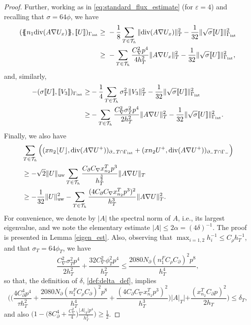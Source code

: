 \documentclass{amsart}
\newcommand{\norm}[2]{\|{#1}\|_{{#2}}}
\newcommand{\jump}[1]{[\kern-0.6mm [{#1}]\kern-0.6mm]}
\newcommand{\av}[1]{\{\kern-1.2mm \{{#1}\}\kern-1.2mm\}}
\newcommand{\su}{\sum_{T \in \Th}}
\newcommand{\inner}[3]{({#1},{#2})_{{#3}}}
\newcommand{\Th}{\mathcal{T}_h}
\newcommand{\gint}{\Gamma_{\rm int}}
\newcommand{\gif}{\Gamma_-}
\newcommand{\Div}{{\rm div}}
\newcommand{\cinvT}{C_{\partial}}
\newcommand{\cinv}{C_{\nabla}}
\newcommand{\normal}{{n}}
\newcommand{\jumpu}[1]{ \lfloor #1 \rfloor }
\newcommand{\avg }[1]{ \av{ #1}}
\newcommand{\xn}{x_{n_2}^{T}}
\theoremstyle{definition}
\theoremstyle{remark}
\numberwithin{equation}{section}
\begin{document}
\begin{proof}
Further, working as in \eqref{eq:standard_flux_estimate} (for $\varepsilon=4$) and recalling that $\sigma=64\phi$, we have
	\begin{equation*}\begin{split}
			 \inner{\avg{\normal_1 \Div(A\nabla U_x) }}{\jump{U}}{\gint}
			  \geq&\ -\frac{1}{8}  \su \norm{ \Div(A\nabla U_x) }{ T}^2 -  \frac{1}{32}\norm{\sqrt{\sigma} \jump{U}}{\gint}^2\\
			    \geq&\ -  \su \frac{\cinv^2p^4}{4h_T^2}\norm{ A\nabla U_x }{ T}^2 -  \frac{1}{32}\norm{\sqrt{\sigma} \jump{U}}{\gint}^2,
	\end{split}\end{equation*}
	and, similarly,
	\begin{equation*}\begin{split}
		-	   \inner{\sigma \jump{U}}{\jump{ V_3 }}{\gint }
			\geq& -\frac{1}{4}
			\su  \sigma_T^2\norm{ V_3}{T}^2
			-
			\frac{1}{32}   \norm{\sqrt{\sigma}\jump{U}}{\gint }^2\\
				\geq& -
			\su  \frac{\cinv^2\sigma_T^2p^4}{2h_T^2}\norm{A\nabla U}{T}^2
			-
			\frac{1}{32}   \norm{\sqrt{\sigma}\jump{U}}{\gint }^2.
	\end{split}\end{equation*}
	Finally, we also have
	\begin{equation*}\begin{split}
			&\su \Big( \inner{x\normal_2 \jumpu{U}}{ \Div(A\nabla U^+) }{\partial_- T \cap \gint}
			+
			\inner{x\normal_2 U^+}{ \Div(A\nabla U^+) }{\partial_- T \cap \gif}\Big)
			\\
			&\geq  -\sqrt{2}\norm{U}{\rm uw}
	\su	\frac{	\cinvT\cinv	\xn p^3}{h_T^{\frac{3}{2}}}
			\norm{ A \nabla U }{T}\\
			&
			\geq
			-\frac{1}{32}\norm{U}{\rm uw}^2
			-
			\su\frac{(4\cinvT\cinv	\xn p^3)^2}{h_T^3}
			\norm{ A\nabla U }{T}^2.
	\end{split}\end{equation*}
	For convenience, we denote by $|A|$ the spectral norm of $A$, i.e., its largest eigenvalue, and we note the elementary estimate $|A| \leq 2 \alpha=(4\delta)^{-1}$. The proof is presented in Lemma \ref{eigen_est}. Also, observing that $\max_{i=1,2}h_i^{-1}\le C_{\rho} h_T^{-1}$, and that $\sigma_T=64\phi_T$, we have
	\[
	\frac{\cinv^2\sigma_T^2p^4}{2h_T^2}+  \frac{32\cinv^2\phi_T^2 p^4}{h_T^2}\le \frac{2080N_\partial (n_1^FC_\rho\cinvT)^2p^8}{h_T^4},
	\]
	so that, the definition of $\delta$, \eqref{def:delta_def}, implies
	\[
	\Big( \Big(	   \frac{4\cinvT^4p^4}{\tau h_T^2}+ \frac{2080N_\partial (n_1^FC_\rho\cinvT)^2p^8}{h_T^4}+ \frac{(4\cinvT\cinv	\xn p^3)^2}{h_T^3} \Big)|A|_T| + \frac{(\xn\cinvT p)^2}{2h_T}\Big)\le \delta_T,
	\]
	and also
	$
	\big(1 - \big( 8\cinvT^4+   \frac{\cinv^2}{4} \big) \frac{| A|_T |p^4}{h_T^2}\big) \ge \frac{1}{2}$.



\end{proof}
\end{document}
